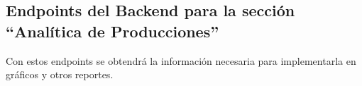\subsection{Endpoints del Backend para la sección ``Analítica de Producciones''}
Con estos endpoints se obtendrá la información necesaria para implementarla en gráficos y otros reportes.
    
    
    
    
    